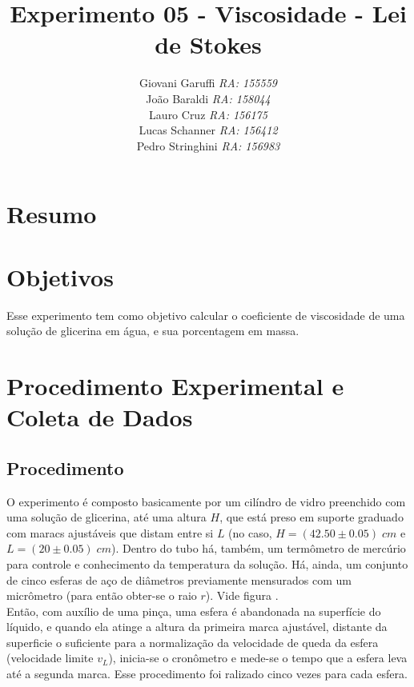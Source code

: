 \documentclass[12pt,a4paper]{article}
\begin{document}
\title{\vspace{70mm}\Huge Experimento 05 - Viscosidade - Lei de Stokes}
\author{ Giovani Garuffi\qquad\hfill
		\textit {RA: 155559}\protect\\
		João Baraldi\hfill
		\textit{RA: 158044}\protect\\
		Lauro Cruz\hfill
		\textit{RA: 156175}\protect\\
		Lucas Schanner\hfill
		\textit{RA: 156412}\protect\\
		Pedro Stringhini\hfill
		\textit {RA: 156983}								
		}
\maketitle
\newpage
\section{Resumo}


\section{Objetivos}
Esse experimento tem como objetivo calcular o coeficiente de viscosidade de uma solução de glicerina em água, e sua porcentagem em massa.


\section{Procedimento Experimental e Coleta de Dados}


\subsection{Procedimento}

O experimento é composto basicamente por um cilíndro de vidro preenchido com uma solução de glicerina, até uma altura $H$, que está preso em suporte graduado com maracs ajustáveis que distam entre si $L$ (no caso, $H = (42.50 \pm 0.05) \; cm$ e $L = (20 \pm 0.05) \; cm$). Dentro do tubo há, também, um termômetro de mercúrio para controle e conhecimento da temperatura da solução. Há, ainda, um conjunto de cinco esferas de aço de diâmetros previamente mensurados com um micrômetro (para então obter-se o raio $r$). Vide figura %
.\\

Então, com auxílio de uma pinça, uma esfera é abandonada na superfície do líquido, e quando ela atinge a altura da primeira marca ajustável, distante da superficie o suficiente para a normalização da velocidade de queda da esfera (velocidade limite $v_L$), inicia-se o cronômetro e mede-se o tempo que a esfera leva até a segunda marca. Esse procedimento foi ralizado cinco vezes para cada esfera.\\
\end{document}
